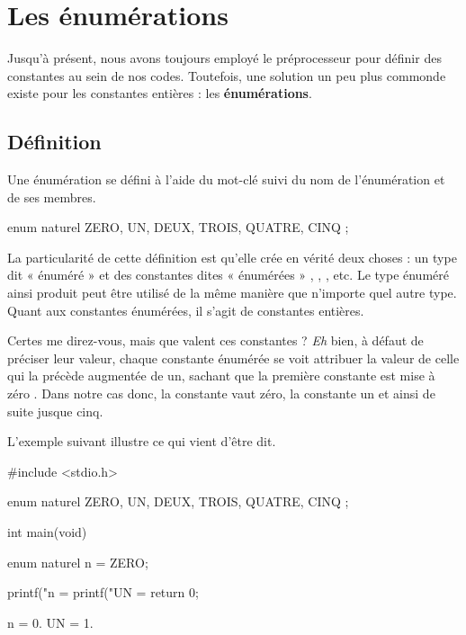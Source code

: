 \chapter{Les énumérations}
\label{les-enumerations}

  Jusqu'à présent, nous   avons toujours employé le préprocesseur pour 
  définir des constantes au sein de nos codes. Toutefois, une solution 
  un peu plus commonde existe pour les constantes entières : les 
  \textbf{énumérations}.

\section{Définition}
\label{definition-4}

Une énumération se défini à l'aide du mot-clé 
suivi du nom de l'énumération et de ses membres.

\begin{C}
enum naturel { ZERO, UN, DEUX, TROIS, QUATRE, CINQ };
\end{C}

La particularité de cette définition est qu'elle crée en vérité deux
choses : un type dit « énuméré »  et des
constantes dites « énumérées » , ,
, etc. Le type énuméré ainsi produit peut être utilisé de
la même manière que n'importe quel autre type. Quant aux constantes
énumérées, il s'agit de constantes entières.

Certes me direz-vous, mais que valent ces constantes ? \emph{Eh} bien, à
défaut de préciser leur valeur, chaque constante énumérée se voit
attribuer la valeur de celle qui la précède augmentée de un, sachant que
la première constante est mise à zéro . Dans notre cas donc, la
constante  vaut zéro, la constante  un et ainsi
de suite jusque cinq.

L'exemple suivant illustre ce qui vient d'être dit.

\begin{C}
#include <stdio.h>

enum naturel { ZERO, UN, DEUX, TROIS, QUATRE, CINQ };


int main(void)
{
    enum naturel n = ZERO;

    printf("n = %
    printf("UN = %
    return 0;
}
\end{C}

\begin{C}
n = 0.
UN = 1.
\end{C}

